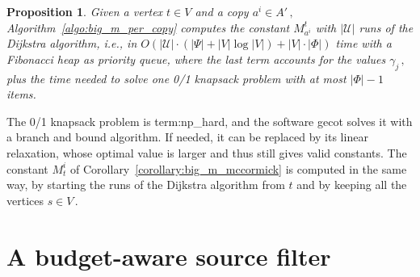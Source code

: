 \documentclass[11pt,a4paper]{report}
\newtheorem{proposition}[theorem]{Proposition}
\theoremstyle{definition}
\theoremstyle{remark}
\begin{document}
\begin{proposition}
  Given a vertex $t \in V$ and a copy $a^i \in A'\,,$ Algorithm~\ref{algo:big_m_per_copy} computes the constant $M^t_{a^i}$ with $|\mathcal{U}|$ runs of the Dijkstra algorithm, i.e., in $O(|\mathcal{U}| \cdot (|\Psi| + |V| \log |V|) + |V| \cdot |\Phi|)$ time with a Fibonacci heap as priority queue, where the last term accounts for the values $\gamma_j\,,$ plus the time needed to solve one 0/1 knapsack problem with at most $|\Phi| - 1$ items.
\end{proposition}

The 0/1 knapsack problem is \gls{term:np_hard}, and the software gecot solves it with a branch and bound algorithm. If needed, it can be replaced by its linear relaxation, whose optimal value is larger and thus still gives valid constants. The constant $M^i_t$ of Corollary~\ref{corollary:big_m_mccormick} is computed in the same way, by starting the runs of the Dijkstra algorithm from $t$ and by keeping all the vertices $s \in V\,.$


\section{A budget-aware source filter}\label{sec:big_m_budget_filter}
\end{document}
